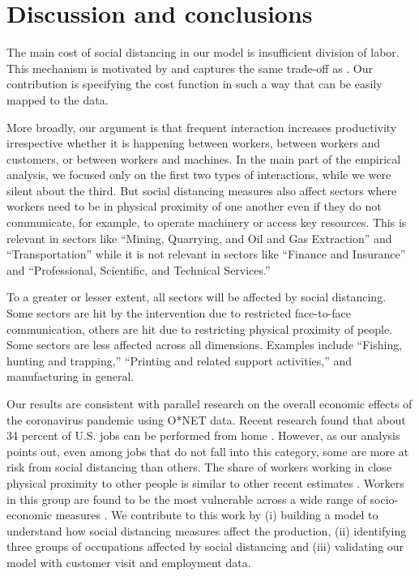 \documentclass[10pt,letterpaper]{article}
\begin{document}
\section*{Discussion and conclusions}

The main cost of social distancing in our model is insufficient division of labor. This mechanism is motivated by \cite{Smith1778-qq} and captures the same trade-off as \cite{Becker1992-ac}. Our contribution is specifying the cost function in such a way that can be easily mapped to the data.

More broadly, our argument is that frequent interaction increases productivity irrespective whether it is happening between workers, between workers and customers, or between workers and machines. In the main part of the empirical analysis, we focused only on the first two types of interactions, while we were silent about the third. But social distancing measures also affect sectors where workers need to be in physical proximity of one another even if they do not communicate, for example, to operate machinery or access key resources. This is relevant in sectors like ``Mining, Quarrying, and Oil and Gas Extraction'' and ``Transportation'' while it is not relevant in sectors like ``Finance and Insurance'' and ``Professional, Scientific, and Technical Services.'' 

To a greater or lesser extent, all sectors will be affected by social distancing. Some sectors are hit by the intervention due to restricted face-to-face communication, others are hit due to restricting physical proximity of people. Some sectors are less affected across all dimensions. Examples include ``Fishing, hunting and trapping,'' ``Printing and related support activities,'' and manufacturing in general. 

Our results are consistent with parallel research on the overall economic effects of the coronavirus pandemic using O*NET data. Recent research found that about 34 percent of U.S. jobs can be performed from home \cite{Dingel2020-lh}. However, as our analysis points out, even among jobs that do not fall into this category, some are more at risk from social distancing than others. The share of workers working in close physical proximity to other people is similar to other recent estimates \cite{Leibovici2020-qr}. Workers in this group are found to be the most vulnerable across a wide range of socio-economic measures \cite{Jin2020-tq,Mongey2020-qc}. We contribute to this work by (i) building a model to understand how social distancing measures affect the production, (ii) identifying three groups of occupations affected by social distancing and (iii) validating our model with customer visit and employment data.
\end{document}
